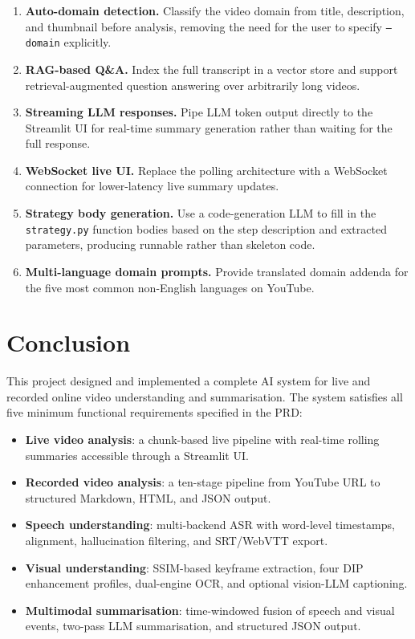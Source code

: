 \documentclass[12pt,a4paper]{article}
\begin{document}
\begin{enumerate}[leftmargin=*]
  \item \textbf{Auto-domain detection.} Classify the video domain from title,
    description, and thumbnail before analysis, removing the need for the user to
    specify \texttt{--domain} explicitly.
  \item \textbf{RAG-based Q\&A.} Index the full transcript in a vector store and
    support retrieval-augmented question answering over arbitrarily long videos.
  \item \textbf{Streaming LLM responses.} Pipe LLM token output directly to the
    Streamlit UI for real-time summary generation rather than waiting for the full
    response.
  \item \textbf{WebSocket live UI.} Replace the polling architecture with a WebSocket
    connection for lower-latency live summary updates.
  \item \textbf{Strategy body generation.} Use a code-generation LLM to fill in
    the \texttt{strategy.py} function bodies based on the step description and
    extracted parameters, producing runnable rather than skeleton code.
  \item \textbf{Multi-language domain prompts.} Provide translated domain addenda for
    the five most common non-English languages on YouTube.
\end{enumerate}

\section{Conclusion}
\label{sec:conclusion}

This project designed and implemented a complete AI system for live and recorded online
video understanding and summarisation. The system satisfies all five minimum functional
requirements specified in the PRD:

\begin{itemize}[leftmargin=*]
  \item \textbf{Live video analysis}: a chunk-based live pipeline with real-time rolling
    summaries accessible through a Streamlit UI.
  \item \textbf{Recorded video analysis}: a ten-stage pipeline from YouTube URL to
    structured Markdown, HTML, and JSON output.
  \item \textbf{Speech understanding}: multi-backend ASR with word-level timestamps,
    alignment, hallucination filtering, and SRT/WebVTT export.
  \item \textbf{Visual understanding}: SSIM-based keyframe extraction, four DIP
    enhancement profiles, dual-engine OCR, and optional vision-LLM captioning.
  \item \textbf{Multimodal summarisation}: time-windowed fusion of speech and visual
    events, two-pass LLM summarisation, and structured JSON output.
\end{itemize}
\end{document}
